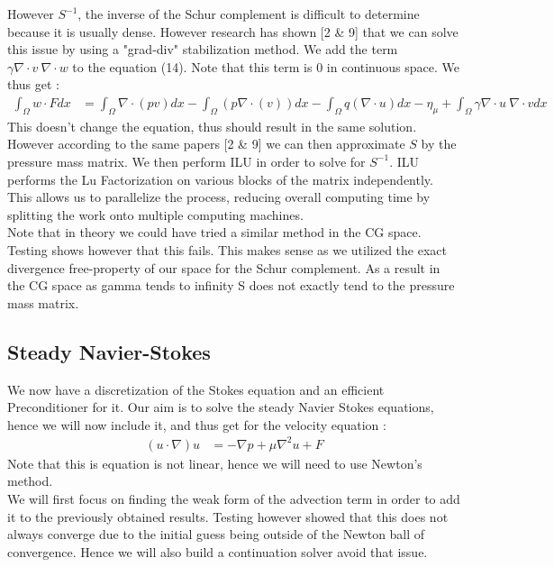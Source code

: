 \documentclass[11pt,twoside,a4paper]{article}
\begin{document}
 However $S^{-1}$, the inverse of the Schur complement is difficult to determine because it is usually dense. However research has shown [2 \& 9] that we can solve this issue by using a "grad-div" stabilization method. We add the term $\gamma \nabla \cdot v \: \nabla \cdot w$ to the equation (14). Note that this term is 0 in continuous space. We thus get :
\begin{align}
\int_\Omega w \cdot F dx &= \int_\Omega \nabla \cdot (p v) dx - \int_\Omega ( p \nabla \cdot (v)) dx - \int_\Omega q (\nabla \cdot u) dx  - \eta_\mu + \int_\Omega \gamma \nabla \cdot u \: \nabla \cdot v dx
\end{align}
This doesn't change the equation, thus should result in the same solution. However according to the same papers [2 \& 9] we can then approximate $S$ by the pressure mass matrix. We then perform ILU in order to solve for $S^{-1}$. ILU performs the Lu Factorization on various blocks of the matrix independently. This allows us to parallelize the process, reducing overall computing time by splitting the work onto multiple computing machines.\\
Note that in theory we could have tried a similar method in the CG space.
Testing shows however that this fails.
This makes sense as we utilized the exact divergence free-property of our space for the Schur complement.
As a result in the CG space as gamma tends to infinity S does not exactly tend to the pressure mass matrix.

\subsection{Steady Navier-Stokes}
We now have a discretization of the Stokes equation and an efficient Preconditioner for it.
Our aim is to solve the steady Navier Stokes equations, hence we will now include it, and thus get for the velocity equation :
\begin{align*}
(u \cdot \nabla) u &= -\nabla p + \mu \nabla^2 u + F
\end{align*}
Note that this is equation is not linear, hence we will need to use Newton's method.\\
We will first focus on finding the weak form of the advection term in order to add it to the previously obtained results. Testing however showed that this does not always converge due to the initial guess being outside of the Newton ball of convergence. Hence we will also build a continuation solver avoid that issue.
\end{document}

